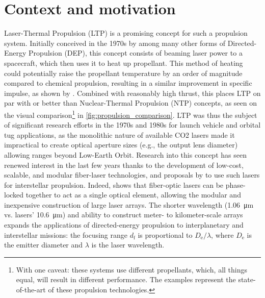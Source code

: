     \section{Context and motivation}
        Laser-Thermal Propulsion (LTP) is a promising concept for such a propulsion system. Initially conceived in the 1970s by \textcite{kantrowitzRelevanceSpace1971} among many other forms of Directed-Energy Propulsion (DEP), this concept consists of beaming laser power to a spacecraft, which then uses it to heat up propellant. This method of heating could potentially raise the propellant temperature by an order of magnitude compared to chemical propulsion, resulting in a similar improvement in specific impulse, as shown by \textcite{noredApplicationHighPower1976}. Combined with reasonably high thrust, this places LTP on par with or better than Nuclear-Thermal Propulsion (NTP) concepts, as seen on the visual comparison\footnote{With one caveat: these systems use different propellants, which, all things equal, will result in different performance. The examples represent the state-of-the-art of these propulsion technologies.} in \autoref{fig:propulsion_comparison}. LTP was thus the subject of significant research efforts in the 1970s and 1980s for launch vehicle and orbital tug applications, as the monolithic nature of available CO2 lasers made it impractical to create optical aperture sizes (e.g., the output lens diameter) allowing ranges beyond Low-Earth Orbit. Research into this concept has seen renewed interest in the last few years thanks to the development of low-cost, scalable, and modular fiber-laser technologies, and proposals by \textcite{lubinRoadmapInterstellarFlight2022} to use such lasers for interstellar propulsion. Indeed, \citeauthor{lubinRoadmapInterstellarFlight2022} shows that fiber-optic lasers can be phase-locked together to act as a single optical element, allowing the modular and inexpensive construction of large laser arrays. The shorter wavelength (\qty{1.06}{\um} vs.  lasers' \qty{10.6}{\um}) and ability to construct meter- to kilometer-scale arrays expands the applications of directed-energy propulsion to interplanetary and interstellar missions: the focusing range $d_\mathrm{f}$ is proportional to $D_\mathrm{e}/\lambda$, where $D_\mathrm{e}$ is the emitter diameter and $\lambda$ is the laser wavelength.

